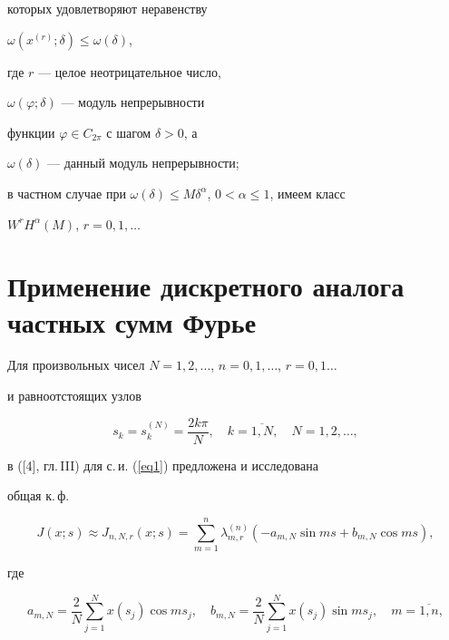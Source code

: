 которых удовлетворяют неравенству


$\omega(x^{(r)};\delta)\leq\omega(\delta)$,


где $r$ --- целое неотрицательное число,


$\omega(\varphi;\delta)$ --- модуль непрерывности


функции $\varphi\in C_{2\pi}$ с шагом $\delta>0$, а


$\omega(\delta)$ --- данный модуль непрерывности;


в частном случае при $\omega(\delta)\leq


M\delta^\alpha$, $0<\alpha\leq1$, имеем класс


$W^rH^\alpha(M)$, $r=0,1,\dotsc$








\section{Применение дискретного аналога частных сумм Фурье}








Для произвольных чисел $N=1,2,\dotsc$, $n=0,1,\dotsc$, $r=0,1\dotsc$


и равноотстоящих узлов


\begin{equation} \label{eq2}


s_k=s_k^{(N)}=\frac{2k\pi}{N},\quad k=\overline{1,N},\quad


N=1,2,\dotsc,


\end{equation}


в ([4], гл.\,III) для с.\,и. (\ref{eq1}) предложена и исследована


общая к.\,ф.


\begin{equation} \label{eq3}


J(x;s)\approx J_{n,N,r}(x;s)=\sum_{m=1}^n


\lambda_{m,r}^{(n)}(-a_{m,N}\sin ms+b_{m,N}\cos ms),


\end{equation}


где


\begin{equation} \label{eq4}


a_{m,N}=\frac{2}{N}\sum_{j=1}^N x(s_j)\cos ms_j,\quad


b_{m,N}=\frac{2}{N}\sum_{j=1}^N x(s_j)\sin ms_j,\quad


m=\overline{1,n},


\end{equation}


